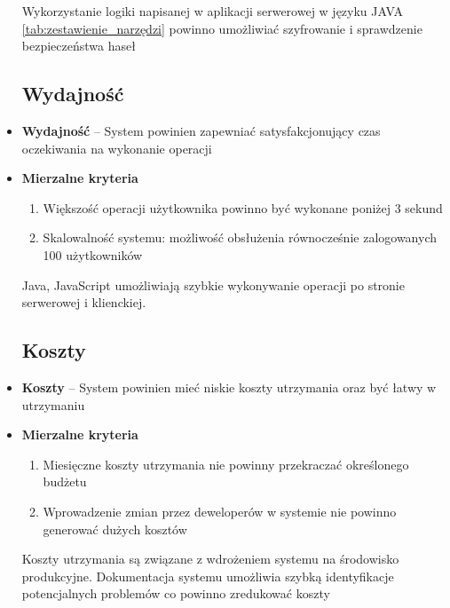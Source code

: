 \begin{itemize}
		Wykorzystanie logiki napisanej w aplikacji serwerowej w języku JAVA \ref{tab:zestawienie_narzędzi} powinno umożliwiać szyfrowanie i sprawdzenie bezpieczeństwa haseł
		
		\subsection{Wydajność}
		\item \textbf{Wydajność} -- System powinien zapewniać satysfakcjonujący czas oczekiwania na wykonanie operacji
	\item \textbf{Mierzalne kryteria}
		\begin{enumerate}
			\item Większość operacji użytkownika powinno być wykonane poniżej 3 sekund
			\item Skalowalność systemu: możliwość obsłużenia równocześnie zalogowanych 100 użytkowników
		\end{enumerate}
		
		Java, JavaScript umożliwiają szybkie wykonywanie operacji po stronie serwerowej i klienckiej.
		
		\subsection{Koszty}
	\item \textbf{Koszty} -- System powinien mieć niskie koszty utrzymania oraz być łatwy w utrzymaniu
	\item \textbf{Mierzalne kryteria}
		\begin{enumerate}
			\item Miesięczne koszty utrzymania nie powinny przekraczać określonego budżetu 
			\item Wprowadzenie zmian przez deweloperów w systemie nie powinno generować dużych kosztów 
		\end{enumerate}
		
	Koszty utrzymania są związane z wdrożeniem systemu na środowisko produkcyjne. Dokumentacja systemu umożliwia szybką identyfikacje potencjalnych problemów co powinno zredukować koszty
\end{itemize}
 









